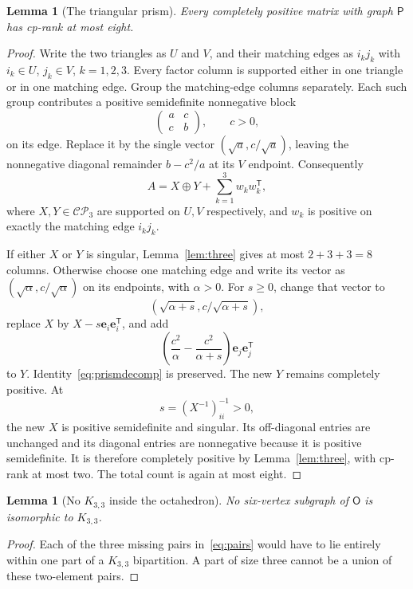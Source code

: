 \documentclass[11pt,a4paper]{article}
\newtheorem{lemma}[theorem]{Lemma}
\theoremstyle{definition}
\newcommand{\CP}{\mathcal{CP}}
\newcommand{\OO}{\mathsf{O}}
\newcommand{\PP}{\mathsf{P}}
\newcommand{\ee}{\mathbf e}
\newcommand{\T}{\mathsf T}
\begin{document}
\begin{lemma}[The triangular prism]\label{lem:prism}
Every completely positive matrix with graph $\PP$ has cp-rank at most eight.
\end{lemma}
\begin{proof}
Write the two triangles as $U$ and $V$, and their matching edges as $i_kj_k$ with $i_k\in U$, $j_k\in V$, $k=1,2,3$. Every factor column is supported either in one triangle or in one matching edge. Group the matching-edge columns separately. Each such group contributes a positive semidefinite nonnegative block
\[
 \begin{pmatrix}a&c\\c&b\end{pmatrix},\qquad c>0,
\]
on its edge. Replace it by the single vector $(\sqrt a,c/\sqrt a)$, leaving the nonnegative diagonal remainder $b-c^2/a$ at its $V$ endpoint. Consequently
\begin{equation}\label{eq:prismdecomp}
 A=X\oplus Y+\sum_{k=1}^3 w_k w_k^{\T},
\end{equation}
where $X,Y\in\CP_3$ are supported on $U,V$ respectively, and $w_k$ is positive on exactly the matching edge $i_kj_k$.

If either $X$ or $Y$ is singular, Lemma~\ref{lem:three} gives at most $2+3+3=8$ columns. Otherwise choose one matching edge and write its vector as $(\sqrt\alpha,c/\sqrt\alpha)$ on its endpoints, with $\alpha>0$. For $s\geq0$, change that vector to
\[
 (\sqrt{\alpha+s},c/\sqrt{\alpha+s}),
\]
replace $X$ by $X-s\ee_i\ee_i^{\T}$, and add
\[
 \left(\frac{c^2}{\alpha}-\frac{c^2}{\alpha+s}\right)\ee_j\ee_j^{\T}
\]
to $Y$. Identity~\eqref{eq:prismdecomp} is preserved. The new $Y$ remains completely positive. At
\[
 s=(X^{-1})_{ii}^{-1}>0,
\]
the new $X$ is positive semidefinite and singular. Its off-diagonal entries are unchanged and its diagonal entries are nonnegative because it is positive semidefinite. It is therefore completely positive by Lemma~\ref{lem:three}, with cp-rank at most two. The total count is again at most eight.
\end{proof}

\begin{lemma}[No $K_{3,3}$ inside the octahedron]\label{lem:noK33}
No six-vertex subgraph of $\OO$ is isomorphic to $K_{3,3}$.
\end{lemma}
\begin{proof}
Each of the three missing pairs in~\eqref{eq:pairs} would have to lie entirely within one part of a $K_{3,3}$ bipartition. A part of size three cannot be a union of these two-element pairs.
\end{proof}
\end{document}
